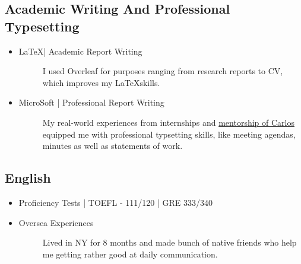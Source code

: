 \documentclass[a4paper]{article}
\begin{document}
\subsection{Academic Writing And Professional Typesetting}
\begin{itemize}
    \item\begin{description}
        \item[\LaTeX | Academic Report Writing] 
        I used Overleaf for purposes ranging from research reports to CV, which improves my \LaTeX skills.
    \end{description}
    \item\begin{description}
        \item[MicroSoft | Professional Report Writing] 
        My real-world experiences from internships and \hyperlink{integrated}{mentorship of Carlos} equipped me with professional typsetting skills, like meeting agendas, minutes as well as statements of work.
    \end{description}
\end{itemize}

\subsection{English}
\begin{itemize}
    \item \begin{description}
        \item[Proficiency Tests | TOEFL - 111/120 | GRE 333/340]  
    \end{description}
    \item \begin{description}
        \item[Oversea Experiences] Lived in NY for 8 months and made bunch of native friends who help me getting rather good at daily communication.
    \end{description}
\end{itemize}
\end{document}

